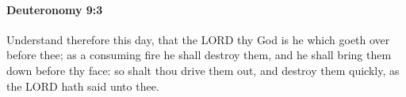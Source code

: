 
		\paragraph{Deuteronomy 9:3} %
			\label{DEUTERONOMY-9-3}

			Understand therefore this day, that the LORD thy God is he which goeth over before thee; as a consuming fire he shall destroy them, and he shall bring them down before thy face: so shalt thou drive them out, and destroy them quickly, as the LORD hath said unto thee.


